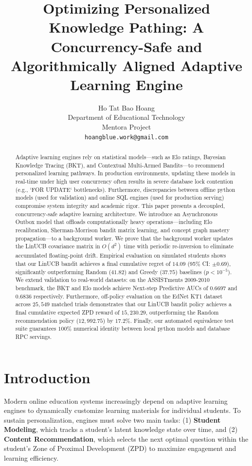 \documentclass{article}
\title{Optimizing Personalized Knowledge Pathing: A Concurrency-Safe and Algorithmically Aligned Adaptive Learning Engine}
\author{
  Ho Tat Bao Hoang \\
  Department of Educational Technology \\
  Mentora Project \\
  \texttt{hoangblue.work@gmail.com}
}
\begin{document}
\maketitle

\begin{abstract}
Adaptive learning engines rely on statistical models—such as Elo ratings, Bayesian Knowledge Tracing (BKT), and Contextual Multi-Armed Bandits—to recommend personalized learning pathways. In production environments, updating these models in real-time under high user concurrency often results in severe database lock contention (e.g., `FOR UPDATE` bottlenecks). Furthermore, discrepancies between offline python models (used for validation) and online SQL engines (used for production serving) compromise system integrity and academic rigor. This paper presents a decoupled, concurrency-safe adaptive learning architecture. We introduce an Asynchronous Outbox model that offloads computationally heavy operations—including Elo recalibration, Sherman-Morrison bandit matrix learning, and concept graph mastery propagation—to a background worker. We prove that the background worker updates the LinUCB covariance matrix in $O(d^2)$ time with periodic re-inversion to eliminate accumulated floating-point drift. Empirical evaluation on simulated students shows that our LinUCB bandit achieves a final cumulative regret of $14.09$ (95\% CI: $\pm 0.69$), significantly outperforming Random ($41.82$) and Greedy ($37.75$) baselines ($p < 10^{-5}$). We extend validation to real-world datasets: on the ASSISTments 2009-2010 benchmark, the BKT and Elo models achieve Next-step Predictive AUCs of $0.6697$ and $0.6836$ respectively. Furthermore, off-policy evaluation on the EdNet KT1 dataset across $25,549$ matched trials demonstrates that our LinUCB bandit policy achieves a final cumulative expected ZPD reward of $15,230.29$, outperforming the Random recommendation policy ($12,992.75$) by $17.2\%$. Finally, our automated equivalence test suite guarantees $100\%$ numerical identity between local python models and database RPC servings.
\end{abstract}




\section{Introduction}
Modern online education systems increasingly depend on adaptive learning engines to dynamically customize learning materials for individual students. To sustain personalization, engines must solve two main tasks: (1) \textbf{Student Modeling}, which tracks a student's latent knowledge state over time, and (2) \textbf{Content Recommendation}, which selects the next optimal question within the student's Zone of Proximal Development (ZPD) to maximize engagement and learning efficiency.
\end{document}
